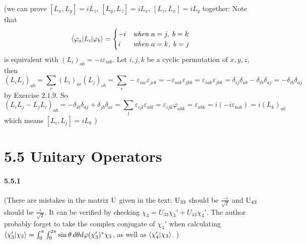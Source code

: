 \documentclass[a4paper]{article}
\begin{document}
\noindent
(we can prove $[L_x,L_y]=iL_z$, $[L_y,L_z]=iL_x$, $[L_z,L_x]=iL_y$ together:
Note that 
\[
\langle\varphi_a|L_i|\varphi_b\rangle=\begin{cases}
-i & \textit{when $a=j,\;b=k$}\\
i & \textit{when $a=k,\;b=j$}
\end{cases}
\]
is equivalent with $(L_i)_{ab}=-i\varepsilon_{iab}$.
Let $i,j,k$ be a cyclic permutation of $x,y,z$, then
\[
(L_iL_j)_{ab}=\sum_c(L_i)_{ac}(L_j)_{cb}=\sum_c-\varepsilon_{iac}\varepsilon_{jcb}=-\varepsilon_{iak}\varepsilon_{jkb}=\varepsilon_{iak}\varepsilon_{jbk}=\delta_{ij}\delta_{ab}-\delta_{ib}\delta_{aj}=-\delta_{ib}\delta_{aj}
\]
by Exercise 2.1.9. So
\[
(L_iL_j-L_jL_i)_{ab}=-\delta_{ib}\delta_{aj}+\delta_{jb}\delta_{ai}=\sum_l\varepsilon_{ijl}\varepsilon_{abl}=\varepsilon_{ijk}\varphi_{abk}=\varepsilon_{abk}=i(-i\varepsilon_{kab})=i(L_k)_{ab}
\]
which means $[L_i,L_j]=iL_k$ )

\section*{5.5 Unitary Operators}

\paragraph{5.5.1}
(There are mistakes in the matrix $\mathrm{U}$ given in the text: $\mathrm{U}_{33}$ should be $\frac{-i}{\sqrt{2}}$ and $\mathrm{U}_{43}$ should be $\frac{i}{\sqrt{2}}$. It can be verified by checking $\chi_3=U_{33}\chi_3'+U_{43}\chi_4'$. The author probably forget to take the complex conjugate of $\chi_3'$ when calculating $\langle\chi_3'|\chi_3\rangle=\int_0^\pi\int_0^{2\pi}\sin\theta\,d\theta d\varphi(\chi_3')^*\chi_3$, as well as $\langle\chi_4'|\chi_3\rangle$. )
\medskip
\end{document}
